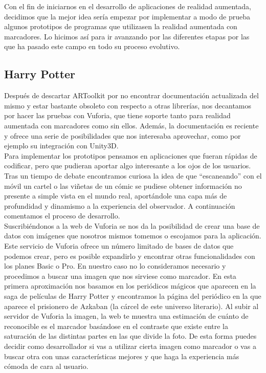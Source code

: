 Con el fin de iniciarnos en el desarrollo de aplicaciones de realidad aumentada, decidimos que la mejor idea sería empezar por implementar a modo de prueba algunos prototipos de programas que utilizasen la realidad aumentada con marcadores. Lo hicimos así para ir avanzando por las diferentes etapas por las que ha pasado este campo en todo su proceso evolutivo.

\subsection{Harry Potter}
Después de descartar ARToolkit por no encontrar documentación actualizada del mismo y estar bastante obsoleto con respecto a otras librerías, nos decantamos por hacer las pruebas con Vuforia, que tiene soporte tanto para realidad aumentada con marcadores como sin ellos. Además, la documentación es reciente y ofrece una serie de posibilidades que nos interesaba aprovechar, como por ejemplo su integración con Unity3D.\\

Para implementar los prototipos pensamos en aplicaciones que fueran rápidas de codificar, pero que pudieran aportar algo interesante a los ojos de los usuarios. Tras un tiempo de debate encontramos curiosa la idea de que “escaneando” con el móvil un cartel o las viñetas de un cómic se pudiese obtener información no presente a simple vista en el mundo real, aportándole una capa más de profundidad y dinamismo a la experiencia del observador. A continuación comentamos el proceso de desarrollo.\\

Suscribiéndonos a la web de Vuforia se nos da la posibilidad de crear una base de datos con imágenes que nosotros mismos tomemos o escojamos para la aplicación. Este servicio de Vuforia ofrece un número limitado de bases de datos que podemos crear, pero es posible expandirlo y encontrar otras funcionalidades con los planes Basic o Pro. En nuestro caso no lo consideramos necesario y procedimos a buscar una imagen que nos sirviese como marcador. En esta primera aproximación nos basamos en los periódicos mágicos que aparecen en la saga de películas de Harry Potter y encontramos la página del periódico en la que aparece el prisionero de Azkaban (la cárcel de este universo literario). Al subir al servidor de Vuforia la imagen, la web te muestra una estimación de cuánto de reconocible es el marcador basándose en el contraste que existe entre la saturación de las distintas partes en las que divide la foto. De esta forma puedes decidir como desarrollador si vas a utilizar cierta imagen como marcador o vas a buscar otra con unas características mejores y que haga la experiencia más cómoda de cara al usuario.\\

